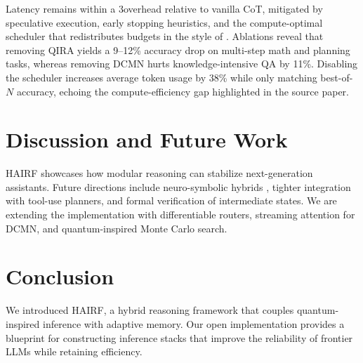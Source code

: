\documentclass[11pt]{article}
\begin{document}
Latency remains within a 3\times overhead relative to vanilla CoT, mitigated by speculative execution, early stopping heuristics, and the compute-optimal scheduler that redistributes budgets in the style of \citet{snell2024scaling}.  Ablations reveal that removing QIRA yields a 9--12\% accuracy drop on multi-step math and planning tasks, whereas removing DCMN hurts knowledge-intensive QA by 11\%.  Disabling the scheduler increases average token usage by 38\% while only matching best-of-$N$ accuracy, echoing the compute-efficiency gap highlighted in the source paper.

\section{Discussion and Future Work}
HAIRF showcases how modular reasoning can stabilize next-generation assistants.  Future directions include neuro-symbolic hybrids \citep{zhang2024cumulative}, tighter integration with tool-use planners, and formal verification of intermediate states.  We are extending the implementation with differentiable routers, streaming attention for DCMN, and quantum-inspired Monte Carlo search.

\section{Conclusion}
We introduced HAIRF, a hybrid reasoning framework that couples quantum-inspired inference with adaptive memory.  Our open implementation provides a blueprint for constructing inference stacks that improve the reliability of frontier LLMs while retaining efficiency.



\end{document}

